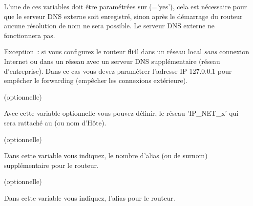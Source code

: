 \begin{description}
{        L'une de ces variables doit être paramétrées sur (='yes'), cela est
        nécessaire pour que le serveur DNS externe soit enregistré, sinon après
        le démarrage du routeur aucune résolution de nom ne sera possible.
        Le serveur DNS externe ne fonctionnera pas.

      Exception~: si vous configurez le routeur fli4l dans un réseau local 
      \emph{sans} connexion Internet ou dans un réseau avec un serveur DNS
      supplémentaire (réseau d'entreprise). Dans ce cas vous devez paramètrer
      l'adresse IP 127.0.0.1 pour empêcher le forwarding (empêcher les connexions
      extérieure).}

     (optionnelle)

    {Avec cette variable optionnelle vous pouvez définir, le réseau 'IP\_NET\_x'
    qui sera rattaché au  (ou nom d'Hôte).}

     (optionnelle)

    {Dans cette variable vous indiquez, le nombre d'alias (ou de surnom)
    supplémentaire pour le routeur.}

     (optionnelle)

    {Dans cette variable vous indiquez, l'alias pour le routeur.}

  \end{description}
